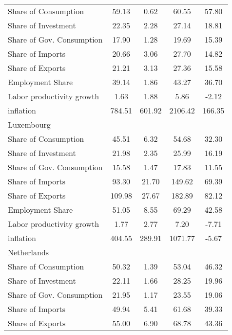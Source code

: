 {\begin{longtable}{l*{1}{cccc}}
Share of Consumption&       59.13&        0.62&       60.55&       57.80\\
Share of Investment &       22.35&        2.28&       27.14&       18.81\\
Share of Gov. Consumption&       17.90&        1.28&       19.69&       15.39\\
Share of Imports    &       20.66&        3.06&       27.70&       14.82\\
Share of Exports    &       21.21&        3.13&       27.36&       15.58\\
Employment Share    &       39.14&        1.86&       43.27&       36.70\\
Labor productivity growth&        1.63&        1.88&        5.86&       -2.12\\
inflation           &      784.51&      601.92&     2106.42&      166.35\\
Luxembourg          &            &            &            &            \\
Share of Consumption&       45.51&        6.32&       54.68&       32.30\\
Share of Investment &       21.98&        2.35&       25.99&       16.19\\
Share of Gov. Consumption&       15.58&        1.47&       17.83&       11.55\\
Share of Imports    &       93.30&       21.70&      149.62&       69.39\\
Share of Exports    &      109.98&       27.67&      182.89&       82.12\\
Employment Share    &       51.05&        8.55&       69.29&       42.58\\
Labor productivity growth&        1.77&        2.77&        7.20&       -7.71\\
inflation           &      404.55&      289.91&     1071.77&       -5.67\\
Netherlands         &            &            &            &            \\
Share of Consumption&       50.32&        1.39&       53.04&       46.32\\
Share of Investment &       22.11&        1.66&       28.25&       19.96\\
Share of Gov. Consumption&       21.95&        1.17&       23.55&       19.06\\
Share of Imports    &       49.94&        5.41&       61.68&       39.33\\
Share of Exports    &       55.00&        6.90&       68.78&       43.36\\

\end{longtable}}
